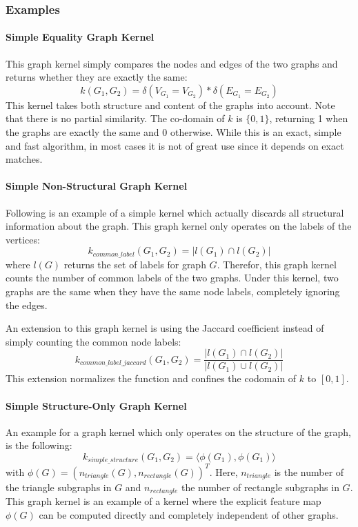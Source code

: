 
\subsubsection{Examples}
\paragraph{Simple Equality Graph Kernel}
This graph kernel simply compares the nodes and edges of the two graphs and returns whether they are exactly the same:
\begin{equation*}
    k(G_1, G_2) = \delta(V_{G_1} = V_{G_2}) * \delta(E_{G_1} = E_{G_2})
\end{equation*}
This kernel takes both structure and content of the graphs into account. Note that there is no partial similarity. The co-domain of $k$ is $\{0, 1\}$, returning 1 when the graphs are exactly the same and 0 otherwise.
While this is an exact, simple and fast algorithm, in most cases it is not of great use since it depends on exact matches.

\paragraph{Simple Non-Structural Graph Kernel}
Following is an example of a simple kernel which actually discards all structural information about the graph. This graph kernel only operates on the labels of the vertices:
\begin{equation*}
k_{common\_label}(G_1, G_2) = | l(G_1) \cap l(G_2) |
\end{equation*}
where $l(G)$ returns the set of labels for graph $G$.
Therefor, this graph kernel counts the number of common labels of the two graphs. Under this kernel, two graphs are the same when they have the same node labels, completely ignoring the edges.

An extension to this graph kernel is using the Jaccard coefficient instead of simply counting the common node labels:
\begin{equation*}
k_{common\_label\_jaccard}(G_1, G_2) = \frac{| l(G_1) \cap l(G_2) |}{| l(G_1) \cup l(G_2) |}
\end{equation*}
This extension normalizes the function and confines the codomain of $k$ to $[0, 1]$.

\paragraph{Simple Structure-Only Graph Kernel}
An example for a graph kernel which only operates on the structure of the graph, is the following:
\begin{equation*}
k_{simple\_structure}(G_1, G_2) = \langle \phi(G_1), \phi(G_1) \rangle
\end{equation*}
with $\phi(G) = (n_{triangle}(G), n_{rectangle}(G))^T$. Here, $n_{triangle}$ is the number of the triangle subgraphs in $G$ and $n_{rectangle}$ the number of rectangle subgraphs in $G$.
This graph kernel is an example of a kernel where the explicit feature map $\phi(G)$ can be computed directly and completely independent of other graphs.

